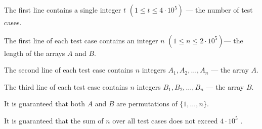 The first line contains a single integer $t$ $(1 \le t \le 4\cdot 10^5)$ --- the number of test cases.

The first line of each test case contains an integer $n$ $(1 \le n \le 2\cdot 10^5)$--- the length of the arrays $A$ and $B$.

The second line of each test case contains $n$ integers $A_1,A_2,\dots,A_n$ --- the array $A$.

The third line of each test case contains $n$ integers $B_1,B_2,\dots,B_n$ --- the array $B$.

It is guaranteed that both $A$ and $B$ are permutations of $\{1,\dots,n\}$.

It is guaranteed that the sum of $n$ over all test cases does not exceed $4\cdot 10^5$ .